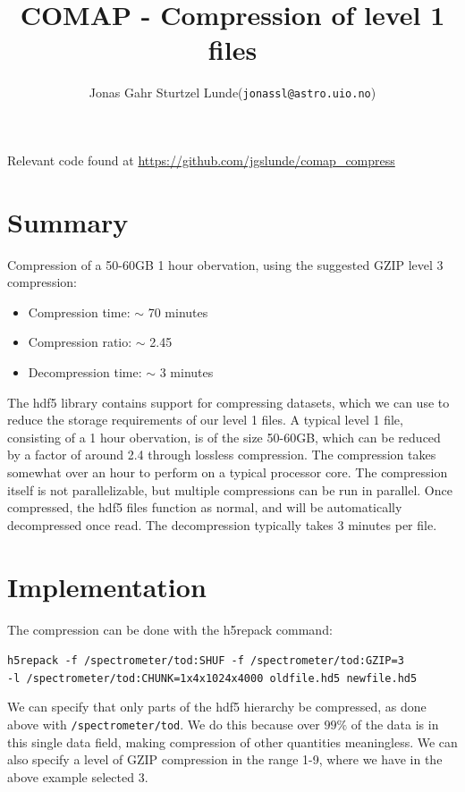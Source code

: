 \documentclass[10pt, a4paper]{article}
\begin{document}
\title{COMAP - Compression of level 1 files}
\author{
    \begin{tabular}{r l}
        Jonas Gahr Sturtzel Lunde & (\texttt{jonassl@astro.uio.no})
    \end{tabular}}
\maketitle
Relevant code found at \url{https://github.com/jgslunde/comap_compress}
\vspace{0.7cm}

\section*{Summary}
Compression of a 50-60GB 1 hour obervation, using the suggested GZIP level 3 compression:
\begin{itemize}
    \item Compression time: $\sim$ 70 minutes
    \item Compression ratio: $\sim$ 2.45
    \item Decompression time: $\sim$ 3 minutes
\end{itemize}

The hdf5 library contains support for compressing datasets, which we can use to reduce the storage requirements of our level 1 files. A typical level 1 file, consisting of a 1 hour obervation, is of the size 50-60GB, which can be reduced by a factor of around 2.4 through lossless compression. The compression takes somewhat over an hour to perform on a typical processor core. The compression itself is not parallelizable, but multiple compressions can be run in parallel. Once compressed, the hdf5 files function as normal, and will be automatically decompressed once read. The decompression typically takes 3 minutes per file.


\section*{Implementation}
The compression can be done with the h5repack command:

\texttt{h5repack -f /spectrometer/tod:SHUF -f /spectrometer/tod:GZIP=3\\
-l /spectrometer/tod:CHUNK=1x4x1024x4000 oldfile.hd5 newfile.hd5}

We can specify that only parts of the hdf5 hierarchy be compressed, as done above with \texttt{/spectrometer/tod}. We do this because over $99\%$ of the data is in this single data field, making compression of other quantities meaningless. We can also specify a level of GZIP compression in the range 1-9, where we have in the above example selected 3.
\end{document}
